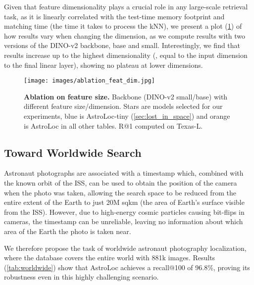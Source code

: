 

Given that feature dimensionality plays a crucial role in any large-scale retrieval task, as it is linearly correlated with the test-time memory footprint and matching time (\ie the time it takes to process the kNN), we present a plot (\cref{fig:ablation_feat_dim}) of how results vary when changing the dimension, as we compute results with two versions of the DINO-v2 backbone, base and small.
Interestingly, we find that results increase up to the highest dimensionality (, equal to the input dimension to the final linear layer), showing no plateau at lower dimensions.
\begin{figure}
    \begin{center}
    \texttt{[image: images/ablation\_feat\_dim.jpg]}
    \end{center}
    \vspace{-6mm}
    \caption{\textbf{Ablation on feature size.} Backbone (DINO-v2 small/base) with different feature size/dimension. Stars
    are models selected for our experiments, blue is AstroLoc-tiny (\cref{sec:lost_in_space}) and orange is AstroLoc in all other tables.
    R@1 computed on Texas-L.
    }
    \vspace{-2mm}
    \label{fig:ablation_feat_dim}
\end{figure}

\subsection{Toward Worldwide Search}
\label{sec:worldwide_search}
Astronaut photographs are associated with a timestamp which, combined with the known orbit of the ISS, can be used to obtain the position of the camera when the photo was taken, allowing the search space to be reduced from the entire extent of the Earth to just 20M sqkm (the area of Earth's surface visible from the ISS).
However, due to high-energy cosmic particles causing bit-flips in cameras, the timestamp can be unreliable, leaving no information about which area of the Earth the photo is taken near.

We therefore propose the task of worldwide astronaut photography localization, where the database covers the entire world with 881k images.
Results (\cref{tab:worldwide}) show that AstroLoc achieves a recall@100 of 96.8\%, proving its robustness even in this highly challenging scenario.


